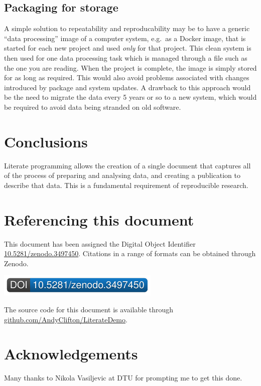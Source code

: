 \documentclass[11pt,]{article}
\begin{document}
\hypertarget{packaging-for-storage}{%
\subsection{Packaging for storage}\label{packaging-for-storage}}

A simple solution to repeatability and reproducability may be to have a generic ``data processing'' image of a computer system, e.g.~as a Docker image, that is started for each new project and used \emph{only} for that project. This clean system is then used for one data processing task which is managed through a file such as the one you are reading. When the project is complete, the image is simply stored for as long as required. This would also avoid problems associated with changes introduced by package and system updates. A drawback to this approach would be the need to migrate the data every 5 years or so to a new system, which would be required to avoid data being stranded on old software.

\hypertarget{conclusions}{%
\section{Conclusions}\label{conclusions}}

Literate programming allows the creation of a single document that captures all of the process of preparing and analysing data, and creating a publication to describe that data. This is a fundamental requirement of reproducible research.

\hypertarget{referencing-this-document}{%
\section*{Referencing this document}\label{referencing-this-document}}

This document has been assigned the Digital Object Identifier \href{http://dx.doi.org/10.5281/zenodo.3497450}{10.5281/zenodo.3497450}. Citations in a range of formats can be obtained through Zenodo.

\href{https://doi.org/10.5281/zenodo.3497450}{\includegraphics{DOIBadge3497450.pdf}}

The source code for this document is available through \href{https://github.com/AndyClifton/LiterateSciencePublishingDemo}{github.com/AndyClifton/LiterateDemo}.

\hypertarget{acknowledgements}{%
\section*{Acknowledgements}\label{acknowledgements}}

Many thanks to Nikola Vasiljevic at DTU for prompting me to get this done.

\renewcommand\refname{Bibliography}

\end{document}
